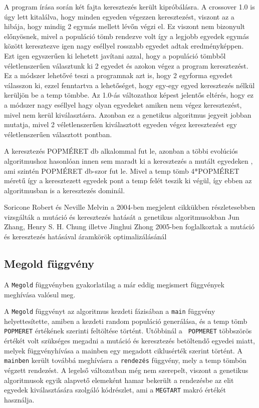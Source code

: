 \documentclass[12pt,a4paper,oneside]{report}
\begin{document}
            A program írása során két fajta keresztezés került kipróbálásra.
            A crossover 1.0 is úgy lett kitalálva, hogy minden egyeden végezzen keresztezést, viszont az a hibája, hogy mindig 2 egymás mellett lévőn végzi el.
            Ez viszont nem bizonyult előnyösnek, mivel a populáció tömb rendezve volt így a legjobb egyedek egymás között keresztezve igen nagy eséllyel rosszabb egyedet adtak eredményképpen.
            Ezt igen egyszerűen ki lehetett javítani azzal, hogy a populáció tömbből véletlenszerűen választunk ki 2 egyedet és azokon végez a program keresztezést.
            Ez a módszer lehetővé teszi a programnak azt is, hogy 2 egyforma egyedet válasszon ki, ezzel fenntartva a lehetőséget, hogy egy-egy egyed keresztezés nélkül kerüljön be a temp tömbbe.
            Az 1.0-ás változathoz képest jelentős eltérés, hogy ez a módszer nagy eséllyel hagy olyan egyedeket amiken nem végez keresztezést, mivel nem kerül kiválasztásra.
            Azonban ez a genetikus algoritmus jegyeit jobban mutatja, mivel 2 véletlenszerűen kiválasztott egyeden végez keresztezést egy véletlenszerűen választott pontban.
            
            
            A keresztezés POPMÉRET db alkalommal fut le, azonban a többi evolúciós algoritmushoz hasonlóan innen sem maradt ki a keresztezés a mutált egyedeken , ami szintén POPMÉRET db-szor fut le.
            Mivel a temp tömb 4*POPMÉRET méretű így a keresztezett egyedek pont a temp felét teszik ki végül, így ebben az algoritmusban is a keresztezés dominál.

Soricone Robert és Neville Melvin a 2004-ben megjelent cikkükben részletesebben vizsgálták a mutáció és keresztezés hatását a genetikus algoritmusokban\cite{Soricone:2004:CAG:1046191.1032304}
Jun Zhang, Henry S. H. Chung illetve Jinghui Zhong 2005-ben foglalkoztak a mutáció és keresztezés hatásával áramkörök optimalizálásánál\cite{Zhang:2005:ACM:1068009.1068267}


        \subsection{Megold függvény} %
            	A \texttt{Megold} függvényben gyakorlatilag a már eddig megismert függvények meghívása valósul meg.
	
	A \texttt{Megold} függvényt az algoritmus kezdeti fázisában a  \texttt{main} függvény helyettesítette, amiben a kezdeti random populáció generálása, és a temp tömb\texttt{ POPMERET} értékének szerinti feltöltése történt. Utóbbinál a \texttt{ POPMERET} többszörös értékét volt szükséges megadni a mutáció és keresztezés betöltendő egyedei miatt, melyek függvényhívása a mainben egy megadott ciklusérték szerint történt. A  \texttt{mainben} került továbbá meghívásra a \texttt{rendezés} függvény, mely a temp tömbön végzett rendezést. A legelső változatban még nem szerepelt, viszont a genetikus algoritmusok egyik alapvető elemeként hamar bekerült a rendezésbe az elit egyedek kiválasztására szolgáló kódrészlet, ami a \texttt{MEGTART} makró értékét használja.
\end{document}
